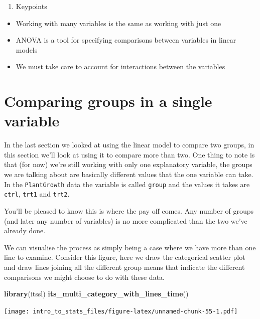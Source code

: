 \documentclass[
]{book}
\newenvironment{Shaded}{\begin{snugshade}}{\end{snugshade}}
\newcommand{\KeywordTok}[1]{\textcolor[rgb]{0.13,0.29,0.53}{\textbf{#1}}}
\newcommand{\NormalTok}[1]{#1}
\providecommand{\tightlist}{%
  \setlength{\itemsep}{0pt}\setlength{\parskip}{0pt}}
\begin{document}
\begin{enumerate}
\def\labelenumi{\arabic{enumi}.}
\setcounter{enumi}{2}
\tightlist
\item
  Keypoints
\end{enumerate}

\begin{itemize}
\tightlist
\item
  Working with many variables is the same as working with just one
\item
  ANOVA is a tool for specifying comparisons between variables in linear models
\item
  We must take care to account for interactions between the variables
\end{itemize}

\hypertarget{comparing-groups-in-a-single-variable}{%
\section{Comparing groups in a single variable}\label{comparing-groups-in-a-single-variable}}

In the last section we looked at using the linear model to compare two groups, in this section we'll look at using it to compare more than two. One thing to note is that (for now) we're still working with only one explanatory variable, the groups we are talking about are basically different values that the one variable can take. In the \texttt{PlantGrowth} data the variable is called \texttt{group} and the values it takes are \texttt{ctrl}, \texttt{trt1} and \texttt{trt2}.

You'll be pleased to know this is where the pay off comes. Any number of groups (and later any number of variables) is no more complicated than the two we've already done.

We can visualise the process as simply being a case where we have more than one line to examine. Consider this figure, here we draw the categorical scatter plot and draw lines joining all the different group means that indicate the different comparisons we might choose to do with these data.

\begin{Shaded}
\begin{Highlighting}[]
\KeywordTok{library}\NormalTok{(itssl)}
\KeywordTok{its_multi_category_with_lines_time}\NormalTok{()}
\end{Highlighting}
\end{Shaded}

\texttt{[image: intro\_to\_stats\_files/figure-latex/unnamed-chunk-55-1.pdf]}
\end{document}
